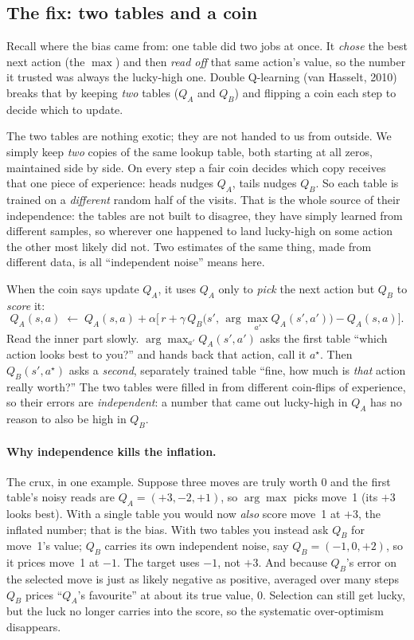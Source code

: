\documentclass[11pt]{article}
\begin{document}
\subsection{The fix: two tables and a coin}\label{sec:doubleq-fix}

Recall where the bias came from: one table did two jobs at once. It \emph{chose} the best next action
(the $\max$) and then \emph{read off} that same action's value, so the number it trusted was always the
lucky-high one. Double Q-learning (van Hasselt, 2010) breaks that by keeping \emph{two} tables ($Q_A$ and
$Q_B$) and flipping a coin each step to decide which to update.

The two tables are nothing exotic; they are not handed to us from outside. We simply keep \emph{two}
copies of the same lookup table, both starting at all zeros, maintained side by side. On every step a
fair coin decides which copy receives that one piece of experience: heads nudges $Q_A$, tails nudges
$Q_B$. So each table is trained on a \emph{different} random half of the visits. That is the whole source
of their independence: the tables are not built to disagree, they have simply learned from different
samples, so wherever one happened to land lucky-high on some action the other most likely did not. Two
estimates of the same thing, made from different data, is all ``independent noise'' means here.

When the coin says update $Q_A$, it uses
$Q_A$ only to \emph{pick} the next action but $Q_B$ to \emph{score} it:
\begin{equation}
Q_A(s,a)\;\leftarrow\;Q_A(s,a)+\alpha\Big[\,r+\gamma\,Q_B\big(s',\,\textstyle\arg\max_{a'}Q_A(s',a')\big)-Q_A(s,a)\Big].
\label{eq:doubleq}
\end{equation}
Read the inner part slowly. $\arg\max_{a'}Q_A(s',a')$ asks the first table ``which action looks best to
you?'' and hands back that action, call it $a^\star$. Then $Q_B(s',a^\star)$ asks a \emph{second},
separately trained table ``fine, how much is \emph{that} action really worth?'' The two tables were
filled in from different coin-flips of experience, so their errors are \emph{independent}: a number that
came out lucky-high in $Q_A$ has no reason to also be high in $Q_B$.

\paragraph{Why independence kills the inflation.} The crux, in one example. Suppose three moves are truly
worth $0$ and the first table's noisy reads are $Q_A=(+3,-2,+1)$, so $\arg\max$ picks move~1 (its $+3$
looks best). With a single table you would now \emph{also} score move~1 at $+3$, the inflated number; that
is the bias. With two tables you instead ask $Q_B$ for move~1's value; $Q_B$ carries its own independent
noise, say $Q_B=(-1,0,+2)$, so it prices move~1 at $-1$. The target uses $-1$, not $+3$. And because
$Q_B$'s error on the selected move is just as likely negative as positive, averaged over many steps $Q_B$
prices ``$Q_A$'s favourite'' at about its true value, $0$. Selection can still get lucky, but the luck no
longer carries into the score, so the systematic over-optimism disappears.
\end{document}
